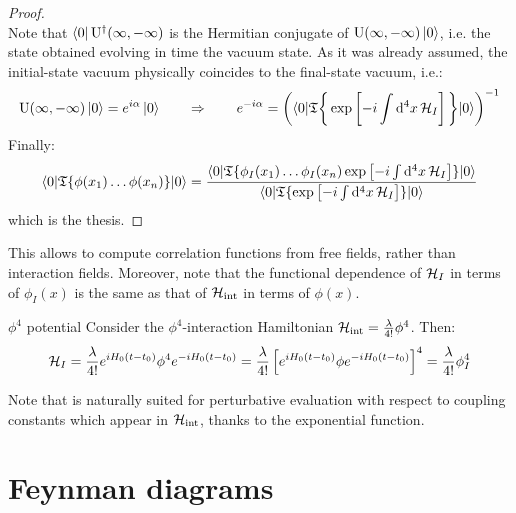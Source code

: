 \begin{proofbox}
\begin{proof}
\begin{equation*}
    \end{equation*}
    Note that $ \bra{0} \mathrm{U}^\dagger(\infty,-\infty) $ is the Hermitian conjugate of $ \mathrm{U}(\infty,-\infty) \ket{0} $, i.e. the state obtained evolving in time the vacuum state. As it was already assumed, the initial-state vacuum physically coincides to the final-state vacuum, i.e.:
    \begin{equation*}
      \mathrm{U}(\infty,-\infty) \ket{0} = e^{i\alpha} \ket{0}
      \qquad \Rightarrow \qquad
      e^{-i \alpha} = \left( \braket{0 | \mathfrak{T}\bigg\{ \exp \left[ -i \int \mathrm{d}^4x\, \mathcal{H}_I \right] \bigg\} | 0} \right)^{-1}
    \end{equation*}
    Finally:
    \begin{equation*}
    \braket{0 | \mathfrak{T}\{\phi(x_1) \dots \phi(x_n)\} | 0} = \frac{\braket{0 | \mathfrak{T}\{\phi_I(x_1) \dots \phi_I(x_n) \exp \left[ -i \int \mathrm{d}^4x\, \mathcal{H}_I \right]\} | 0}}{\braket{0 | \mathfrak{T}\{\exp \left[ -i \int \mathrm{d}^4x\, \mathcal{H}_I \right]\} |0}}
    \end{equation*}
    which is the thesis.
  \end{proof}
\end{proofbox}

This allows to compute correlation functions from free fields, rather than interaction fields. Moreover, note that the functional dependence of $ \mathcal{H}_I $ in terms of $ \phi_I(x) $ is the same as that of $ \mathcal{H}_\text{int} $ in terms of $ \phi(x) $.

\begin{example}{$ \phi^4 $ potential}{}
  Consider the $ \phi^4 $-interaction Hamiltonian $ \mathcal{H}_\text{int} = \frac{\lambda}{4!} \phi^4 $. Then:
  \begin{equation*}
    \begin{split}
      \mathcal{H}_I = \frac{\lambda}{4!} e^{i H_0 (t-t_0)} \phi^4 e^{-i H_0 (t-t_0)} = \frac{\lambda}{4!} \left[ e^{i H_0 (t-t_0)} \phi e^{-i H_0 (t-t_0)} \right]^4 = \frac{\lambda}{4!} \phi_I^4
    \end{split}
  \end{equation*}
\end{example}

Note that  is naturally suited for perturbative evaluation with respect to coupling constants which appear in $ \mathcal{H}_\text{int} $, thanks to the exponential function.

\newpage

\section{Feynman diagrams}

